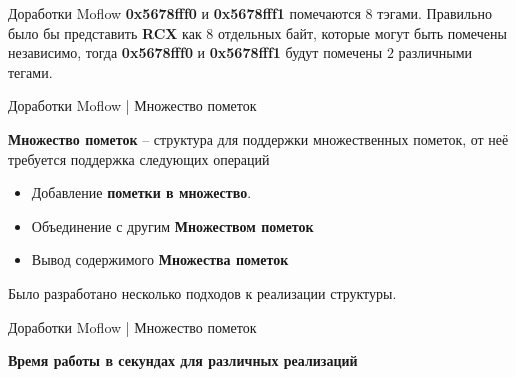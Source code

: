 \documentclass[10pt]{beamer}
\begin{document}
\begin{frame}[fragile]{ Доработки Moflow}
    \textbf{0x5678fff0} и \textbf{0x5678fff1} помечаются $8$ тэгами. Правильно было бы представить \textbf{RCX} как 8 отдельных байт, которые могут быть помечены независимо, тогда \textbf{0x5678fff0} и \textbf{0x5678fff1} будут помечены $2$ различными тегами.

\end{frame}


\begin{frame}{Доработки Moflow | Множество пометок}
    
    \textbf{Множество пометок} -- структура для поддержки множественных пометок, от неё требуется поддержка следующих операций
    \begin{itemize}
        \item Добавление \textbf{пометки в множество}.
        \item Объединение с другим \textbf{Множеством пометок}
        \item Вывод содержимого \textbf{Множества пометок}
     \end{itemize}
     \pause
     Было разработано несколько подходов к реализации структуры.

\end{frame}

\begin{frame}{Доработки Moflow | Множество пометок}

    \textbf{Время работы в секундах для различных реализаций}\\
\end{frame}
\end{document}
